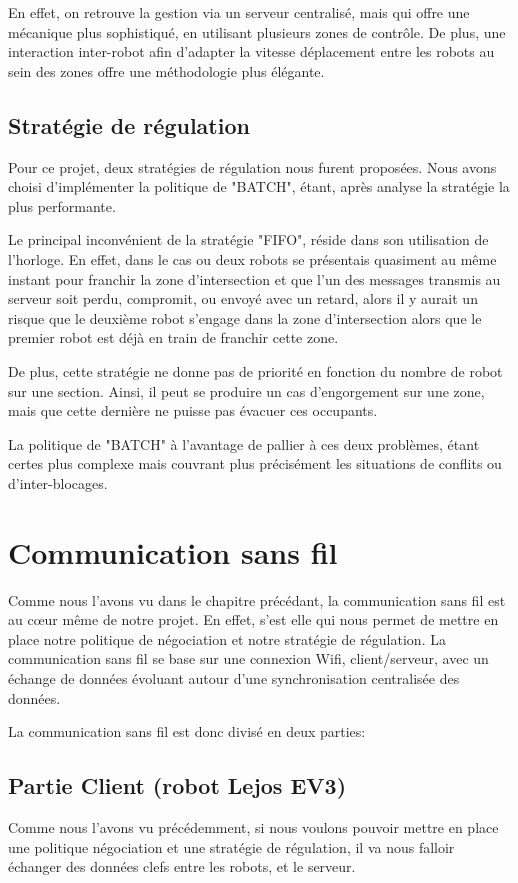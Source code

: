\documentclass[french,a4paper,12pt]{report}
\begin{document}
En effet, on retrouve la gestion via un serveur centralisé, mais qui offre une mécanique plus sophistiqué, en utilisant plusieurs zones de contrôle. De plus, une interaction inter-robot afin d'adapter la vitesse déplacement entre les robots au sein des zones offre une méthodologie plus élégante. 

\section{Stratégie de régulation}
Pour ce projet, deux stratégies de régulation nous furent proposées.
Nous avons choisi d'implémenter la politique de "BATCH", étant, après analyse la stratégie la plus performante.

Le principal inconvénient de la stratégie "FIFO", réside dans son utilisation de l'horloge.
En effet, dans le cas ou deux robots se présentais quasiment au même instant pour franchir la zone d'intersection et que l'un des messages transmis au serveur soit perdu, compromit, ou envoyé avec un retard, alors il y aurait un risque que le deuxième robot s'engage dans la zone d'intersection alors que le premier robot est déjà en train de franchir cette zone.

De plus, cette stratégie ne donne pas de priorité en fonction du nombre de robot sur une section. Ainsi, il peut se produire un cas d'engorgement sur une zone, mais que cette dernière ne puisse pas évacuer ces occupants.

La politique de "BATCH" à l'avantage de pallier à ces deux problèmes, étant certes plus complexe mais couvrant plus précisément les situations de conflits ou d'inter-blocages.

\chapter{Communication sans fil}
Comme nous l'avons vu dans le chapitre précédant, la communication sans fil est au cœur même de notre projet. En effet, s'est elle qui nous permet de mettre en place notre politique de négociation et notre stratégie de régulation.
La communication sans fil se base sur une connexion Wifi, client/serveur, avec un échange de données évoluant autour d'une synchronisation centralisée des données.

La communication sans fil est donc divisé en deux parties:

\section{Partie Client (robot Lejos EV3)}%
Comme nous l'avons vu précédemment, si nous voulons pouvoir mettre en place une politique négociation et une stratégie de régulation, il va nous falloir échanger des données clefs entre les robots, et le serveur.
\end{document}
